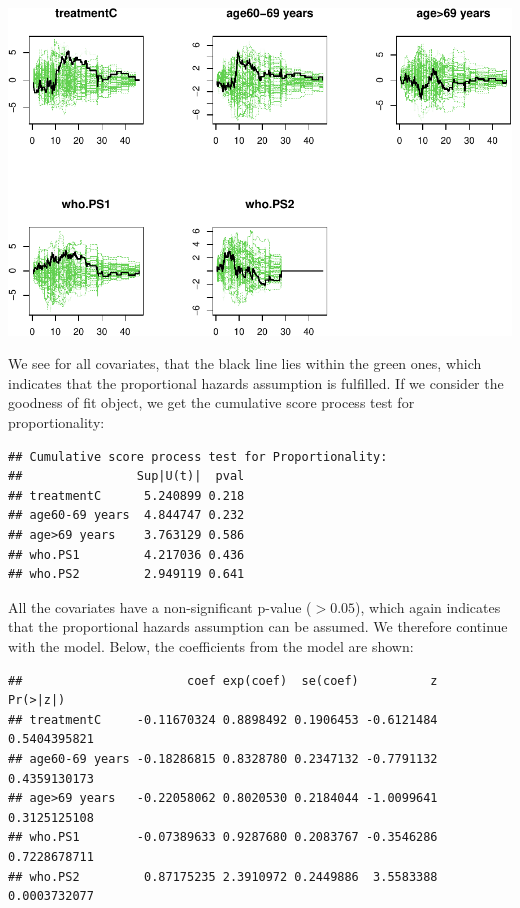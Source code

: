 \documentclass[
  11pt,
]{article}
\newenvironment{Shaded}{\begin{snugshade}}{\end{snugshade}}
\newcommand{\FunctionTok}[1]{\textcolor[rgb]{0.00,0.00,0.00}{#1}}
\newcommand{\NormalTok}[1]{#1}
\newcommand{\SpecialCharTok}[1]{\textcolor[rgb]{0.00,0.00,0.00}{#1}}
\begin{document}
\includegraphics{Exam2021_PracticalPart_files/figure-latex/unnamed-chunk-4-1.pdf}

We see for all covariates, that the black line lies within the green
ones, which indicates that the proportional hazards assumption is
fulfilled. If we consider the goodness of fit object, we get the
cumulative score process test for proportionality:

\begin{verbatim}
## Cumulative score process test for Proportionality:
##                Sup|U(t)|  pval
## treatmentC      5.240899 0.218
## age60-69 years  4.844747 0.232
## age>69 years    3.763129 0.586
## who.PS1         4.217036 0.436
## who.PS2         2.949119 0.641
\end{verbatim}

All the covariates have a non-significant p-value (\(>0.05\)), which
again indicates that the proportional hazards assumption can be assumed.
We therefore continue with the model. Below, the coefficients from the
model are shown:

\begin{Shaded}
\end{Shaded}

\begin{verbatim}
##                       coef exp(coef)  se(coef)          z     Pr(>|z|)
## treatmentC     -0.11670324 0.8898492 0.1906453 -0.6121484 0.5404395821
## age60-69 years -0.18286815 0.8328780 0.2347132 -0.7791132 0.4359130173
## age>69 years   -0.22058062 0.8020530 0.2184044 -1.0099641 0.3125125108
## who.PS1        -0.07389633 0.9287680 0.2083767 -0.3546286 0.7228678711
## who.PS2         0.87175235 2.3910972 0.2449886  3.5583388 0.0003732077
\end{verbatim}
\end{document}
